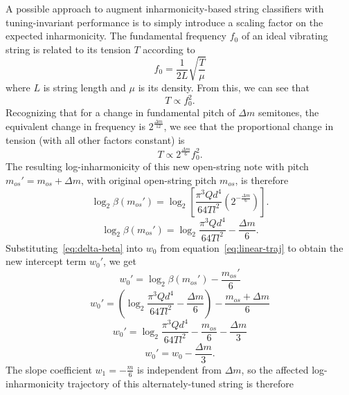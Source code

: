 \documentclass[12pt]{cmuthesis}
\begin{document}
A possible approach to augment inharmonicity-based string classifiers with tuning-invariant performance is to simply introduce a scaling factor on the expected inharmonicity. The fundamental frequency $f_0$ of an ideal vibrating string is related to its tension $T$ according to
\begin{equation}
f_0 = \frac{1}{2L}\sqrt{\frac{T}{\mu}}
\end{equation}
where $L$ is string length and $\mu$ is its density. From this, we can see that
\begin{equation}
T \propto f_0^{2}.
\end{equation}
Recognizing that for a change in fundamental pitch of $\Delta m$ semitones, the equivalent change in frequency is $2^{\frac{\Delta m}{12}}$, we see that the proportional change in tension (with all other factors constant) is
\begin{equation}
T \propto 2^{\frac{\Delta m}{6}}f_0^2.
\end{equation}
The resulting log-inharmonicity of this new open-string note with pitch $m_{os}' = m_{os}+\Delta m$, with original open-string pitch $m_{os}$, is therefore
\begin{equation}
\log_2\beta(m_{os}') = \log_2[ \frac{\pi^3 Q d^4}{64 T l^2}(2^{-\frac{\Delta m}{6}})].
\end{equation}
\begin{equation}
\label{eq:delta-beta}
\log_2\beta(m_{os}') = \log_2\frac{\pi^3 Q d^4}{64 T l^2} - \frac{\Delta m}{6}.
\end{equation}
Substituting~\eqref{eq:delta-beta} into $w_0$ from equation~\eqref{eq:linear-traj} to obtain the new intercept term $w_0'$, we get
\begin{equation}
w_{0}' = \log_2{\beta}(m_{os}') - \frac{m_{os}'}{6}
\end{equation}
\begin{equation}
w_{0}' = (\log_2\frac{\pi^3 Q d^4}{64 T l^2} - \frac{\Delta m}{6}) - \frac{m_{os}+\Delta m}{6}
\end{equation}
\begin{equation}
\label{eq:3.17}
w_{0}' = \log_2\frac{\pi^3 Q d^4}{64 T l^2} - \frac{m_{os}}{6} - \frac{\Delta m}{3}
\end{equation}
\begin{equation}
\label{eq:3.18}
w_{0}' = w_0 - \frac{\Delta m}{3}.
\end{equation}
The slope coefficient $w_1 = -\frac{m}{6}$ is independent from ${\Delta m}$, so the affected log-inharmonicity trajectory of this alternately-tuned string is therefore
\end{document}
